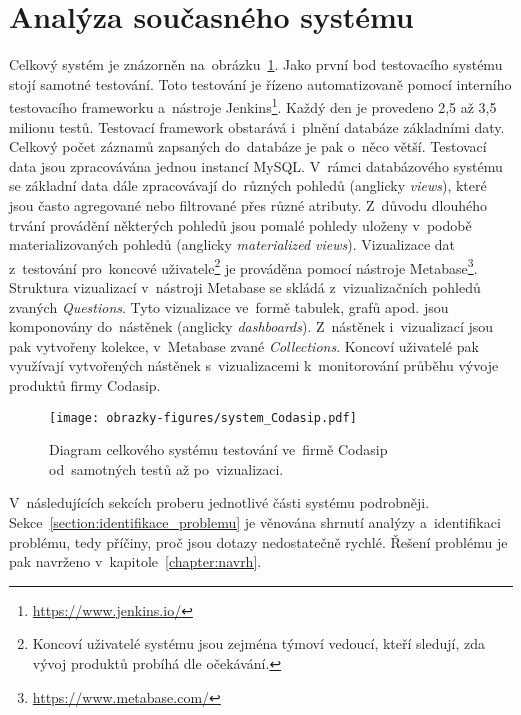 \section{Analýza současného systému}
\label{section:analyza_systemu}
Celkový systém je znázorněn na~obrázku~\ref{img:system_Codasip}. Jako první bod testovacího systému stojí samotné
testování. Toto testování je řízeno automatizovaně pomocí interního testovacího frameworku a~nástroje Jenkins\footnote{\href{https://www.jenkins.io/}{https://www.jenkins.io/}}. Každý den je provedeno 2,5 až 3,5 milionu testů. Testovací framework obstarává i~plnění databáze základními daty. Celkový počet záznamů zapsaných do~databáze
je pak o~něco větší. Testovací data jsou zpracovávána jednou instancí MySQL. V~rámci databázového systému se základní data dále zpracovávají do~různých pohledů (anglicky \textit{views}), které jsou často agregované nebo
filtrované přes různé atributy. Z~důvodu dlouhého trvání provádění některých pohledů jsou pomalé pohledy uloženy
v~podobě materializovaných pohledů (anglicky \textit{materialized views}). Vizualizace dat z~testování pro~koncové
uživatele\footnote{Koncoví uživatelé systému jsou zejména týmoví vedoucí, kteří sledují, zda vývoj produktů probíhá dle očekávání.} je prováděna pomocí nástroje Metabase\footnote{\href{https://www.metabase.com/}{https://www.metabase.com/}}. Struktura vizualizací v~nástroji
Metabase se skládá z~vizualizačních pohledů zvaných \textit{Questions}. Tyto vizualizace ve~formě tabulek, grafů
apod. jsou komponovány do~nástěnek (anglicky \textit{dashboards}). Z~nástěnek i~vizualizací jsou pak vytvořeny kolekce, v~Metabase zvané \textit{Collections}. Koncoví uživatelé pak využívají vytvořených nástěnek s~vizualizacemi k~monitorování průběhu vývoje produktů firmy Codasip.

\begin{figure}[H]
	\centering
	\texttt{[image: obrazky-figures/system\_Codasip.pdf]}
	\caption{Diagram celkového systému testování ve~firmě Codasip od~samotných testů až po~vizualizaci.}
	\label{img:system_Codasip}
\end{figure}
V~následujících sekcích proberu jednotlivé části systému podrobněji. Sekce~\ref{section:identifikace_problemu} je věnována shrnutí analýzy a~identifikaci problému, tedy příčiny, proč jsou dotazy nedostatečně rychlé. Řešení problému je pak navrženo v~kapitole~\ref{chapter:navrh}.

